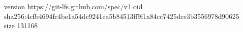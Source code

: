 version https://git-lfs.github.com/spec/v1
oid sha256:4cfb4694fc4be1a54dc9241ea5b84513ff9f1a84cc7425dce3b3556978d90625
size 131168
